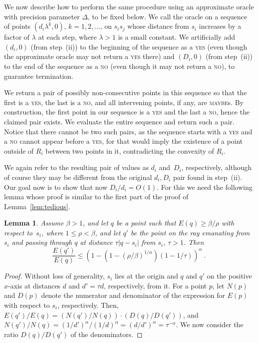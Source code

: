 \documentclass[11pt]{article}
\newtheorem{lemma}[theorem]{Lemma}
\theoremstyle{remark}
\begin{document}
\begin{enumerate}[(i)]
We now describe how to perform the same procedure using an approximate oracle with precision parameter $\Delta$, to be fixed below.
We call the oracle on a sequence of points $(d_i\lambda^k,0)$, $k=1,2,\dots$, on $s_is_j$ whose distance from $s_i$ increases by a factor of $\lambda$ at each step, where $\lambda>1$ is a small constant. We artificially add $(d_i,0)$ (from step~(ii)) to the beginning of the sequence as a \textsc{yes} (even though the approximate oracle may not return a \textsc{yes} there) and $(D_i,0)$ (from step~(ii)) to the end of the sequence as a \textsc{no} (even though it may not return a \textsc{no}), to guarantee termination.

We return a pair of possibly non-consecutive points in this sequence so that the first is a \textsc{yes}, the last is a \textsc{no}, and all intervening points, if any, are \textsc{maybe}s.  By construction, the first point in our sequence is a \textsc{yes} and the last a \textsc{no}, hence the claimed pair exists.  We evaluate the entire sequence and return such a pair.  Notice that there cannot be two such pairs, as the sequence starts with a \textsc{yes} and a \textsc{no} cannot appear before a \textsc{yes}, for that would imply the existence of a point outside of $R_i$ between two points in it, contradicting the convexity of $R_i$.

We again refer to the resulting pair of values as $d_i$ and~$D_i$, respectively, although of course they may be different from the original $d_i, D_i$ pair found in step~(ii). Our goal now is to show that now $D_i/d_i = O(1)$. For this we need the following lemma whose proof is similar to the first part of the proof of Lemma~\ref{lem:tedious}.
 
\begin{lemma}
\label{lem:also_tedious}
Assume $\beta>1$, and
let $q$ be a point such that $E(q) \ge \beta/\rho$ with respect to~$s_i$, where $1 \le \rho < \beta$, and
let $q'$ be the point on the ray emanating from $s_i$ and passing through $q$ at distance $\tau |q-s_i|$ from $s_i$, $\tau > 1$.
Then 
\[
   \frac{E(q')}{E(q)} \le (1 - (1 - (\rho/\beta)^{1/\alpha})(1 - 1/\tau))^\alpha\ .
\]
\end{lemma}

\begin{proof}
  Without loss of generality, $s_i$ lies at
  the origin and $q$ and $q'$ on the positive $x$-axis at distances $d$ and $d'=\tau d$, respectively, from it.
	For a point $p$, let $N(p)$ and $D(p)$ denote the numerator and denominator of the expression for $E(p)$ with respect to $s_i$, respectively.
  Then, $E(q')/E(q) = (N(q')/N(q)) \cdot (D(q)/D(q'))$, and
  $N(q')/N(q) = (1/d')^\alpha/(1/d)^\alpha=(d/d')^\alpha = \tau^{-\alpha}$. 
  We now consider the ratio $D(q)/D(q')$ of the denominators.


\end{proof}
\end{enumerate}
\end{document}
